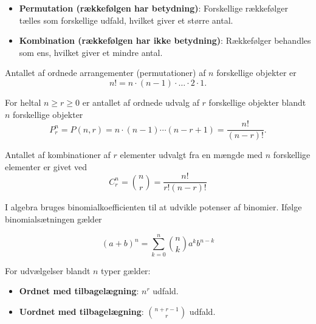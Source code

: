 \begin{definition}
    \begin{itemize}
        \item \textbf{Permutation (rækkefølgen har betydning)}: Forskellige rækkefølger tælles som forskellige udfald, hvilket giver et større antal.
        \item \textbf{Kombination (rækkefølgen har ikke betydning)}: Rækkefølger behandles som ens, hvilket giver et mindre antal.
    \end{itemize}
\end{definition}

\begin{proposition}
    Antallet af ordnede arrangementer (permutationer) af $n$ forskellige objekter er
    \[
    n! = n \cdot (n-1) \cdot \dots \cdot 2 \cdot 1.
    \]
\end{proposition}

\begin{theorem}
    For heltal $n \ge r \ge 0$ er antallet af ordnede udvalg af $r$ forskellige objekter blandt $n$ forskellige objekter
    \[
    P_r^n = P(n,r) = n \cdot (n-1) \cdots (n-r+1) = \frac{n!}{(n-r)!}.
    \]
\end{theorem}

\begin{theorem}[Kombinationer]
    Antallet af kombinationer af $r$ elementer udvalgt fra en mængde med $n$ forskellige elementer er givet ved
    \[
    C_r^n = \binom{n}{r} = \frac{n!}{r!(n-r)!}
    \]
\end{theorem}

\begin{theorem}[Binomialsætningen]
    I algebra bruges binomialkoefficienten til at udvikle potenser af binomier. Ifølge binomialsætningen gælder

$$
(a+b)^n=\sum_{k=0}^n\binom{n}{k} a^k b^{n-k}
$$

\end{theorem}

\begin{proposition}
For udvælgelser blandt $n$ typer gælder:
\begin{itemize}
    \item \textbf{Ordnet med tilbagelægning}: $n^r$ udfald.
    \item \textbf{Uordnet med tilbagelægning}: $\displaystyle \binom{n+r-1}{r}$ udfald. %
\end{itemize}
\end{proposition}

